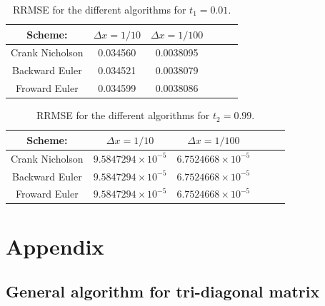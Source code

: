 \documentclass{article}
\begin{document}
\begin{table}[H]
\begin{center}
\caption{RRMSE for the different algorithms for $t_1=0.01$.}
\begin{tabular}{  |c|c|c|c|c|c| } \hline
Scheme:&	$\Delta x =1/10$&$\Delta x = 1/100$ \\ \hline
Crank Nicholson&0.034560&0.0038095\\ \hline
Backward Euler&0.034521&0.0038079\\ \hline
Froward Euler&0.034599&0.0038086\\ \hline
\end{tabular}
\label{tab:error}
\end{center}
\end{table}

\begin{table}[H]
\begin{center}
\caption{RRMSE for the different algorithms for $t_2=0.99$.}
\begin{tabular}{  |c|c|c|c|c|c| } \hline
Scheme:&	$\Delta x =1/10$&$\Delta x = 1/100$ \\ \hline
Crank Nicholson&$9.5847294\times 10^{-5}$&$6.7524668\times10^{-5}$\\ \hline
Backward Euler&$9.5847294\times 10^{-5}$&$6.7524668\times10^{-5}$\\ \hline
Froward Euler&$9.5847294\times 10^{-5}$&$6.7524668\times10^{-5}$\\ \hline
\end{tabular}
\label{tab:error2}
\end{center}
\end{table}

\clearpage

\section{Appendix}

\subsection{General algorithm for tri-diagonal matrix}
\end{document}
